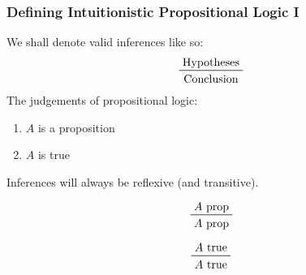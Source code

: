 \documentclass{beamer}
\begin{document}
\begin{frame}
  \frametitle{Defining Intuitionistic Propositional Logic I}
  We shall denote valid inferences like so:
  \begin{displaymath}
    \prftree[r]{}{\text{Hypotheses}}{\text{Conclusion}}
  \end{displaymath}
  The judgements of propositional logic:
  \begin{enumerate}
    \itemsep0.2em
    \item $A$ is a proposition
    \item $A$ is true
  \end{enumerate}
  Inferences will always be reflexive (and transitive). 
  \begin{center}
    \begin{minipage}[b]{0.4\linewidth}
      \begin{displaymath}
        \prftree[r]{}{A\text{ prop}}{A\text{ prop}}
      \end{displaymath}
    \end{minipage}
    \begin{minipage}[b]{0.4\linewidth}
      \begin{displaymath}
        \prftree[r]{}{A\text{ true}}{A\text{ true}}
      \end{displaymath}
    \end{minipage}
  \end{center}

\end{frame}
\end{document}
